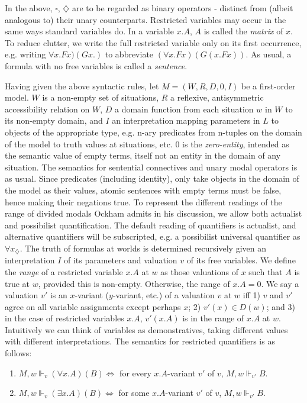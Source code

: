 \documentclass[a4paper]{article}
\begin{document}
In the above, $\square$, $\diamondsuit$ are to be regarded as binary operators  - distinct from (albeit analogous to) their unary counterparts. Restricted variables may occur in the same ways standard variables do. In a variable $x.A$, $A$ is called the \textit{matrix} of $x$. To reduce clutter, we write the full restricted variable only on its first occurrence, e.g. writing $\forall x.Fx)(Gx.)$ to abbreviate $(\forall x.Fx)(G(x.Fx))$. As usual, a formula with no free variables is called a \textit{sentence}. 

Having given the above syntactic rules, let $M = (W, R, D, 0, I)$ be a first-order model. $W$ is a non-empty set of situations, $R$ a reflexive, antisymmetric accessibility relation on $W$, $D$ a domain function from each situation $w$ in $W$ to its non-empty domain, and $I$ an interpretation mapping parameters in $L$ to objects of the appropriate type, e.g. n-ary predicates from n-tuples on the domain of the model to truth values at situations, etc. $0$ is the \textit{zero-entity}, intended as the semantic value of empty terms, itself not an entity in the domain of any situation. The semantics for sentential connectives and unary modal operators is as usual. Since predicates (including identity), only take objects in the domain of the model as their values, atomic sentences with empty terms must be false, hence making their negations true. To represent the different readings of the range of divided modals Ockham admits in his discussion, we allow both actualist and possibilist quantification. The default reading of quantifiers is actualist, and alternative quantifiers will be subscripted, e.g. a possibilist universal quantifier as $\forall x_{\diamondsuit}$. The truth of formulas at worlds is determined recursively given an interpretation $I$ of its parameters and valuation $v$ of its free variables. We define the \textit{range} of a restricted variable $x.A$ at $w$ as those valuations of $x$ such that $A$ is true at $w$, provided this is non-empty. Otherwise, the range of $x.A = 0$. We say a valuation $v'$ is an $x$-variant ($y$-variant, etc.) of a valuation $v$ at $w$ iff 1) $v$ and $v'$ agree on all variable assignments except perhaps $x$; 2) $v'(x) \in D(w)$; and 3) in the case of restricted variables $x.A$, $v'(x.A)$ is in the range of $x.A$ at $w$. Intuitively we can think of variables as demonstratives, taking different values with different interpretations. The semantics for restricted quantifiers is as follows: 
\begin{enumerate}
	\item $M, w \Vdash_{v} (\forall x.A)(B) \Leftrightarrow$ for every $x.A$-variant $v'$ of $v$, $M, w \Vdash_{v'} B$.
	\item $M, w \Vdash_{v} (\exists x.A)(B) \Leftrightarrow$ for some $x.A$-variant $v'$ of $v$, $M, w \Vdash_{v'} B$.
\end{enumerate}
\end{document}
